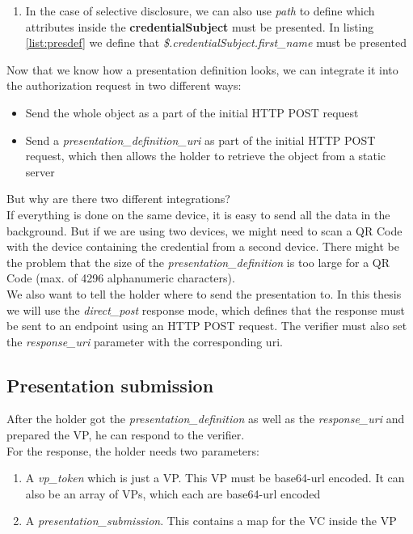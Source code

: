 \documentclass[
	a4paper               %
	,BCOR=0mm            %
	,bibliography=totoc   %
	,listof=totoc         %
	,monolingual
	,twoside=false
]{bfhthesis}              %
\begin{document}
\begin{enumerate}
\begin{enumerate}
\begin{enumerate}
\begin{enumerate}
				\item In the case of selective disclosure, we can also use \textit{path} to define which attributes inside the \textbf{credentialSubject} must be presented. In listing \ref{list:presdef} we define that \textit{\$.credentialSubject.first\_name} must be presented
			\end{enumerate}
		\end{enumerate}
	\end{enumerate}
\end{enumerate}

Now that we know how a presentation definition looks, we can integrate it into the authorization request in two different ways:
\begin{itemize}
	\item Send the whole object as a part of the initial HTTP POST request
	\item Send a \textit{presentation\_definition\_uri} as part of the initial HTTP POST request, which then allows the holder to retrieve the object from a static server
\end{itemize}

But why are there two different integrations?\\
If everything is done on the same device, it is easy to send all the data in the background. But if we are using two devices, we might need to scan a QR Code with the device containing the credential from a second device. There might be the problem that the size of the \textit{presentation\_definition} is too large for a QR Code (max. of 4296 alphanumeric characters).\\

We also want to tell the holder where to send the presentation to.
In this thesis we will use the \textit{direct\_post} response mode, which defines that the response must be sent to an endpoint using an HTTP POST request. The verifier must also set the \textit{response\_uri} parameter with the corresponding uri.

\subsection{Presentation submission}
After the holder got the \textit{presentation\_definition} as well as the \textit{response\_uri} and prepared the VP, he can respond to the verifier.\\

For the response, the holder needs two parameters:
\begin{enumerate}
	\item A \textit{vp\_token} which is just a VP. This VP must be base64-url encoded. It can also be an array of VPs, which each are base64-url encoded
	\item A \textit{presentation\_submission}. This contains a map for the VC inside the VP
\end{enumerate}
\end{document}
